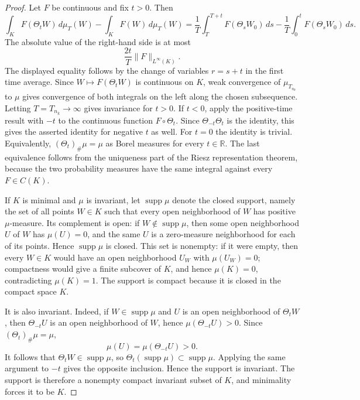 \documentclass[11pt]{amsart}
\theoremstyle{plain}
\theoremstyle{definition}
\theoremstyle{remark}
\numberwithin{equation}{section}
\begin{document}
\begin{proof}
Let \(F\) be continuous and fix \(t>0\).  Then
\[
   \int_K F(\Theta_tW)\,d\mu_T(W)-\int_K F(W)\,d\mu_T(W)
   =
   \frac1T\int_T^{T+t}F(\Theta_sW_0)\,ds
   -
   \frac1T\int_0^tF(\Theta_sW_0)\,ds .
\]
The absolute value of the right-hand side is at most
\[
   \frac{2t}{T}\|F\|_{L^\infty(K)}.
\]
The displayed equality follows by the change of variables \(r=s+t\) in the
first time average.  Since \(W\mapsto F(\Theta_tW)\) is continuous on \(K\),
weak convergence of \(\mu_{T_{n_k}}\) to \(\mu\) gives convergence of both
integrals on the left along the chosen subsequence.  Letting
\(T=T_{n_k}\to\infty\) gives invariance for \(t>0\).  If \(t<0\), apply the
positive-time result with \(-t\) to the continuous function
\(F\circ\Theta_t\).  Since
\(\Theta_{-t}\Theta_t\) is the identity, this gives the asserted identity for
negative \(t\) as well.  For \(t=0\) the identity is trivial.  Equivalently,
\((\Theta_t)_\#\mu=\mu\) as Borel measures for every \(t\in\mathbb R\).  The
last equivalence follows from the uniqueness part of the Riesz representation
theorem, because the two probability measures have the same integral against
every \(F\in C(K)\).

If \(K\) is minimal and \(\mu\) is invariant, let
\(\operatorname{supp}\mu\) denote the closed support, namely the set of all
points \(W\in K\) such that every open neighborhood of \(W\) has positive
\(\mu\)-measure.  Its complement is open: if
\(W\notin\operatorname{supp}\mu\), then some open neighborhood \(U\) of \(W\)
has \(\mu(U)=0\), and the same \(U\) is a zero-measure neighborhood for each
of its points.  Hence \(\operatorname{supp}\mu\) is closed.  This set is
nonempty: if it were empty, then every \(W\in K\) would have an open
neighborhood \(U_W\) with \(\mu(U_W)=0\); compactness would give a finite
subcover of \(K\), and hence \(\mu(K)=0\), contradicting \(\mu(K)=1\).  The
support is compact because it is closed in the compact space \(K\).

It is also invariant.  Indeed, if \(W\in\operatorname{supp}\mu\) and \(U\) is
an open neighborhood of \(\Theta_tW\), then \(\Theta_{-t}U\) is an open
neighborhood of \(W\), hence \(\mu(\Theta_{-t}U)>0\).  Since
\((\Theta_t)_\#\mu=\mu\),
\[
   \mu(U)=\mu(\Theta_{-t}U)>0 .
\]
It follows that \(\Theta_tW\in\operatorname{supp}\mu\), so
\(\Theta_t(\operatorname{supp}\mu)\subset\operatorname{supp}\mu\).  Applying
the same argument to \(-t\) gives the opposite inclusion.  Hence the support
is invariant.  The support is therefore a nonempty compact invariant subset
of \(K\), and minimality forces it to be \(K\).
\end{proof}
\end{document}

